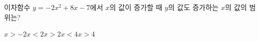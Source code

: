\hspace*{2mm}\begin{minipage}[t]{\dimexpr\linewidth-2mm\relax}\vspace{0pt}
이차함수 $y=-2x^2+8x-7$에서 $x$의 값이 증가할 때 $y$의 값도 증가하는 $x$의 값의 범위는?
\begin{choices32}{$x>-2$}{$x<2$}{$x>2$}{$x<4$}{$x>4$}\end{choices32}\end{minipage}

